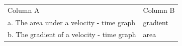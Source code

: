 \begin{enumerate}[noitemsep, label=\textbf{\arabic*}. ]
{{\begin{center}
    \noindent
      \tablelasttail{}
      \begin{xtabular}[t]{|l|l|}\hline
    
    
        Column A &
    
    
        Column B%
     \tabularnewline{}
    
    
        a. The area under a velocity - time graph &
    
    
        gradient%
     \tabularnewline{}
    
    
        b. The gradient of a velocity - time graph &
    
    
        area%
     \tabularnewline{}
    

\end{xtabular}
\end{center}}}
\end{enumerate}
